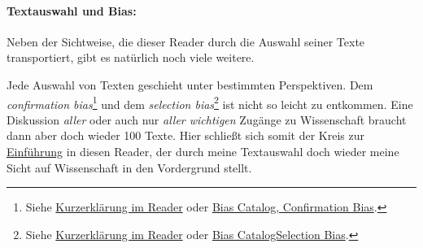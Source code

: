 




\paragraph{Textauswahl und Bias:}
Neben der Sichtweise, die dieser Reader durch die Auswahl seiner Texte
transportiert, gibt es natürlich noch viele weitere.

Jede Auswahl von Texten geschieht unter bestimmten Perspektiven. Dem
\textit{confirmation bias}\footnote{Siehe \hyperref[biases]{Kurzerklärung im Reader} oder \href{https://catalogofbias.org/biases/confirmation-bias/}{Bias Catalog, Confirmation Bias}.} und dem 
\textit{selection bias}\footnote{Siehe \hyperref[biases]{Kurzerklärung im Reader} oder
\href{https://catalogofbias.org/biases/selection-bias/}{Bias CatalogSelection Bias}.} 
ist nicht so leicht zu entkommen. Eine Diskussion \textit{aller}
oder auch nur \textit{aller wichtigen} Zugänge zu Wissenschaft braucht dann aber doch
wieder 100 Texte. Hier schließt sich somit der Kreis zur \hyperlink{Einführung Kreis}{Einführung} in diesen Reader,
der durch meine Textauswahl doch wieder meine Sicht auf Wissenschaft in den Vordergrund stellt.

